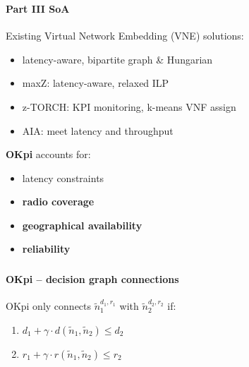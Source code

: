 \documentclass[aspectratio=169]{beamer}
\begin{document}
\begin{frame}
    \frametitle{\secname}
    \framesubtitle{Part III SoA}

    Existing Virtual Network Embedding (VNE) solutions:
    \begin{itemize}
        \item latency-aware, bipartite graph \& Hungarian \cite{getting-the-most}
        \item maxZ: latency-aware, relaxed ILP~\cite{maxZ}
        \item z-TORCH: KPI monitoring, k-means VNF assign~\cite{z-TORCH}
        \item AIA: meet latency and throughput~\cite{adaptive-interference}
    \end{itemize}
    \textbf{\color{red}OKpi} accounts for:
    \begin{itemize}
        \item latency constraints
        \item \textbf{\color{red}radio coverage}
        \item \textbf{\color{red}geographical availability}
        \item \textbf{\color{red}reliability}
    \end{itemize}
\end{frame}














\begin{frame}
    \frametitle{\secname}
    \framesubtitle{OKpi -- decision graph connections}
    OKpi only connects $\tilde{n}_1^{d_1,r_1}$ with $\tilde{n}_2^{d_2,r_2}$ if:
    \begin{enumerate}
        \item $d_1+\gamma\cdot d(\tilde{n}_1,\tilde{n}_2)\le d_2$
        \item $r_1+\gamma\cdot r(\tilde{n}_1,\tilde{n}_2)\le r_2$
    \end{enumerate}
\end{frame}
\end{document}
